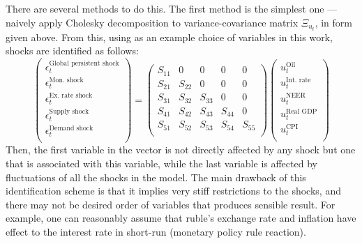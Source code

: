 \documentclass[12pt, a4paper]{extarticle}
\begin{document}
There are several methods to do this. The first method is the simplest one --- naively apply Cholesky decomposition to variance-covariance matrix $\Xi_{u_t}$, in form given above. From this, using as an example choice of variables in this work, shocks are identified as follows:
\begin{equation}
	\begin{pmatrix}
		\epsilon^{\text{Global persistent shock}}_t\\
		\epsilon^{\text{Mon. shock}}_t\\
		\epsilon^{\text{Ex. rate shock}}_t\\
		\epsilon^{\text{Supply shock}}_t\\
		\epsilon^{\text{Demand shock}}_t\\
	\end{pmatrix} = 
	\begin{pmatrix}
		S_{11} & 0 & 0 & 0 & 0 \\
		S_{21} & S_{22} & 0 & 0 & 0\\
		S_{31} & S_{32} & S_{33} & 0 & 0 \\
		S_{41} & S_{42} & S_{43} & S_{44} & 0 \\
		S_{51} & S_{52} & S_{53} & S_{54} & S_{55} \\
	\end{pmatrix} 
	\begin{pmatrix}
		u^{\text{Oil}}_t\\
		u^{\text{Int. rate}}_t\\
		u^{\text{NEER}}_t\\
		u^{\text{Real GDP}}_t\\
		u^{\text{CPI}}_t\\
	\end{pmatrix}
\end{equation}
Then, the first variable in the vector is not directly affected by any shock but one that is associated with this variable, while the last variable is affected by fluctuations of all the shocks in the model. The main drawback of this identification scheme is that it implies very stiff restrictions to the shocks, and there may not be desired order of variables that produces sensible result. For example, one can reasonably assume that ruble's exchange rate and inflation have effect to the interest rate in short-run (monetary policy rule reaction).
\end{document}

